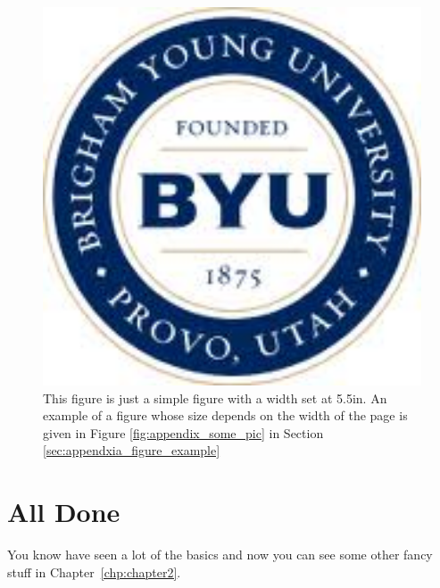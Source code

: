 \begin{figure}[hhhhhtb]
  \centering
  \includegraphics[width=5.5in,natwidth=610,natheight=642]{figures/intro/stuff.jpg}
  \caption[Example Fixed Width Figure]{
This figure is just a simple figure with a width set at 5.5in. An example of a
figure whose size depends on the width of the page is given in
Figure \ref{fig:appendix_some_pic} in Section \ref{sec:appendxia_figure_example}}
%
  \label{fig:intro_stuff}
\end{figure}

\section{All Done}
You know have seen a lot of the basics and now you can see some
other fancy stuff in Chapter~\ref{chp:chapter2}.
